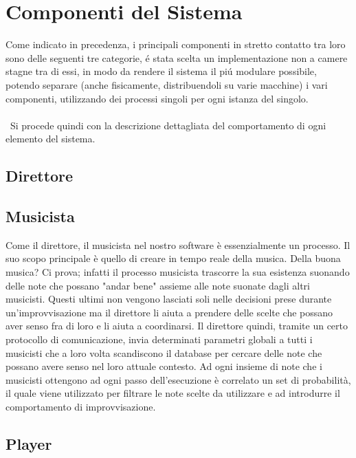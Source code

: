 \section{Componenti del Sistema}
Come indicato in precedenza, i principali componenti in stretto contatto
tra loro sono delle seguenti tre categorie, \'e stata scelta un implementazione
non a camere stagne tra di essi, in modo da rendere il sistema il pi\'u modulare
possibile, potendo separare (anche fisicamente, distribuendoli su varie macchine)
i vari componenti, utilizzando dei processi singoli per ogni istanza del singolo.\\\
\\\
Si procede quindi con la descrizione dettagliata del comportamento di ogni
elemento del sistema.

\subsection{Direttore}

\subsection{Musicista}
Come il direttore, il musicista nel nostro software è essenzialmente un processo. Il suo scopo principale è quello di creare in tempo reale della musica. Della buona musica? Ci prova; infatti il processo musicista trascorre la sua esistenza suonando delle note che possano "andar bene" assieme alle note suonate dagli altri musicisti. Questi ultimi non vengono lasciati soli nelle decisioni prese durante un'improvvisazione ma il direttore li aiuta a prendere delle scelte che possano aver senso fra di loro e li aiuta a coordinarsi. Il direttore quindi, tramite un certo protocollo di comunicazione, invia determinati parametri globali a tutti i musicisti che a loro volta scandiscono il database per cercare delle note che possano avere senso nel loro attuale contesto. Ad ogni insieme di note che i musicisti ottengono ad ogni passo dell'esecuzione è correlato un set di probabilità, il quale viene utilizzato per filtrare le note scelte da utilizzare e ad introdurre il comportamento di improvvisazione.

\subsection{Player}
